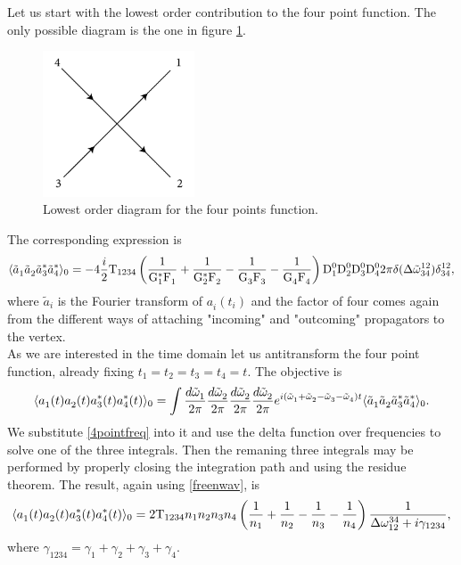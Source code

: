 Let us start with the lowest order contribution to the four point function. The only possible diagram is the one in figure \ref{fig:treefourpoints}.
\begin{figure}[ht]
    \centering
    \includegraphics[width=0.4\textwidth]{images/quarticvertex.jpg}
    \caption{Lowest order diagram for the four points function.}
    \label{fig:treefourpoints}
\end{figure}
The corresponding expression is
\begin{equation}
    \langle \tilde{a}_1^{} \tilde{a}_2^{} \tilde{a}_3^{*}\tilde{a}_4^{*} \rangle_{0} = -4\frac{i}{2} \mathrm{T}_{1234}\left(\dfrac{1}{\mathrm{G}_1^*\mathrm{F}_1^{}}+\dfrac{1}{\mathrm{G}_2^*\mathrm{F}_2^{}}-\dfrac{1}{\mathrm{G}_3^{}\mathrm{F}_3^{}}
    -\dfrac{1}{\mathrm{G}_4^{}\mathrm{F}_4^{}}\right)\mathrm{D}_1^0\mathrm{D}_2^0\mathrm{D}_3^0\mathrm{D}_4^0 2\pi \delta(\Delta{\tilde{\omega}}^{12}_{34})\delta^{12}_{34},
    \label{4pointfreq}
\end{equation}
where $\tilde{a}_i^{}$ is the Fourier transform of $a_i^{}(t_i)$ and the factor of four comes again from the different ways of attaching "incoming" and "outcoming" 
propagators to the vertex.\\
As we are interested in the time domain let us antitransform the four point function, already fixing $t_1 = t_2 = t_3 = t_4 = t$. The objective is
\begin{equation}
    \langle a_1^{}(t) a_2^{}(t) a_3^{*}(t) a_4^{*}(t) \rangle_0 = \int \frac{d\tilde{\omega}^{}_1}{2\pi}\frac{d\tilde{\omega}^{}_2}{2\pi}\frac{d\tilde{\omega}^{}_2}{2\pi}\frac{d\tilde{\omega}^{}_2}{2\pi}
    e^{i(\tilde{\omega}^{}_1 + \tilde{\omega}^{}_2  -\tilde{\omega}^{}_3 - \tilde{\omega}^{}_4)t} \langle \tilde{a}_1^{} \tilde{a}_2^{} \tilde{a}_3^{*}\tilde{a}_4^{*} \rangle_{0}.
\end{equation}
We substitute \eqref{4pointfreq} into it and use the delta function over frequencies to solve one of the three integrals. Then the remaning three integrals may 
be performed by properly closing the integration path and using the residue theorem. The result, again using \eqref{freenwav}, is
\begin{equation}
    \langle a_1^{}(t) a_2^{}(t) a_3^{*}(t) a_4^{*}(t) \rangle_0 = 2\mathrm{T}_{1234}n_1 n_2 n_3 n_4\left( \frac{1}{n_1}+\frac{1}{n_2}-\frac{1}{n_3}-\frac{1}{n_4} \right)
    \frac{1}{\Delta{\omega}^{34}_{12} + i\gamma_{1234}},
\end{equation}  
where $\gamma_{1234} = \gamma_1 + \gamma_2 + \gamma_3 + \gamma_4$. \\

